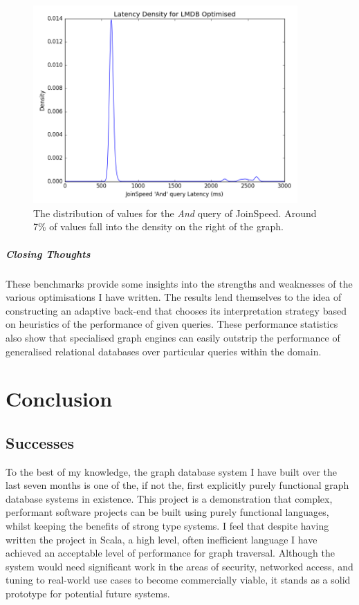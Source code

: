 \documentclass[12pt,a4paper,twoside,openright]{report}
\newcommand\mathName[1]{\textit{#1}}
\begin{document}
\begin{figure}[ht]
\centering
  \includegraphics[width=0.9\textwidth]{scripts/LatencyDensity.png}
  \caption{The distribution of values for the \mathName{And} query of JoinSpeed. Around 7\% of values fall into the density on the right of the graph. }
  \label{fig:LatencyDensity}
\end{figure}


			\paragraph{Closing Thoughts}
			These benchmarks provide some insights into the strengths and weaknesses of the various optimisations I have written. The results lend themselves to the idea of constructing an adaptive back-end that chooses its interpretation strategy based on heuristics of the performance of given queries. These performance statistics also show that specialised graph engines can easily outstrip the performance of generalised relational databases over particular queries within the domain.


	
\chapter{Conclusion}

\section{Successes}
To the best of my knowledge, the graph database system I have built over the last seven months is one of the, if not the, first explicitly purely functional graph database systems in existence. This project is a demonstration that complex, performant software projects can be built using purely functional languages, whilst keeping the benefits of strong type systems. I feel that despite having written the project in Scala, a high level, often inefficient language I have achieved an acceptable level of performance for graph traversal. Although the system would need significant work in the areas of security, networked access, and tuning to real-world use cases to become commercially viable, it stands as a solid prototype for potential future systems.
\end{document}
